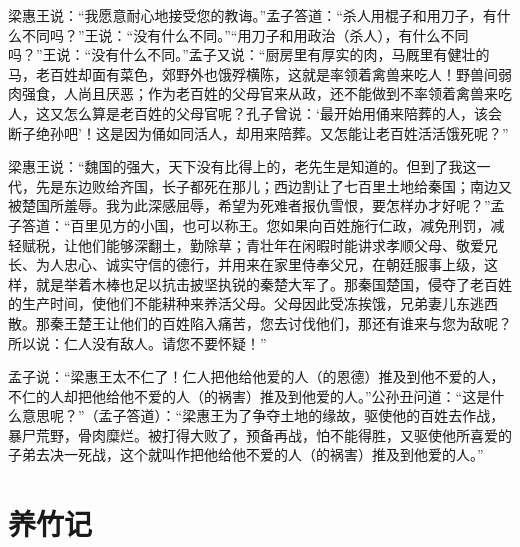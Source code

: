 \documentclass[12pt,UTF-8,openany,a4]{ctexbook}
\begin{document}
\begin{large}
    梁惠王说：“我愿意耐心地接受您的教诲。”孟子答道：“杀人用棍子和用刀子，有什么不同吗？”王说：“没有什么不同。”“用刀子和用政治（杀人），有什么不同吗？”王说：“没有什么不同。”孟子又说：“厨房里有厚实的肉，马厩里有健壮的马，老百姓却面有菜色，郊野外也饿殍横陈，这就是率领着禽兽来吃人！野兽间弱肉强食，人尚且厌恶；作为老百姓的父母官来从政，还不能做到不率领着禽兽来吃人，这又怎么算是老百姓的父母官呢？孔子曾说：‘最开始用俑来陪葬的人，该会断子绝孙吧’！这是因为俑如同活人，却用来陪葬。又怎能让老百姓活活饿死呢？”
    
    梁惠王说：“魏国的强大，天下没有比得上的，老先生是知道的。但到了我这一代，先是东边败给齐国，长子都死在那儿；西边割让了七百里土地给秦国；南边又被楚国所羞辱。我为此深感屈辱，希望为死难者报仇雪恨，要怎样办才好呢？”孟子答道：“百里见方的小国，也可以称王。您如果向百姓施行仁政，减免刑罚，减轻赋税，让他们能够深翻土，勤除草；青壮年在闲暇时能讲求孝顺父母、敬爱兄长、为人忠心、诚实守信的德行，并用来在家里侍奉父兄，在朝廷服事上级，这样，就是举着木棒也足以抗击披坚执锐的秦楚大军了。那秦国楚国，侵夺了老百姓的生产时间，使他们不能耕种来养活父母。父母因此受冻挨饿，兄弟妻儿东逃西散。那秦王楚王让他们的百姓陷入痛苦，您去讨伐他们，那还有谁来与您为敌呢？所以说：仁人没有敌人。请您不要怀疑！”
    
    孟子说：“梁惠王太不仁了！仁人把他给他爱的人（的恩德）推及到他不爱的人，不仁的人却把他给他不爱的人（的祸害）推及到他爱的人。”公孙丑问道：“这是什么意思呢？”（孟子答道）：“梁惠王为了争夺土地的缘故，驱使他的百姓去作战，暴尸荒野，骨肉糜烂。被打得大败了，预备再战，怕不能得胜，又驱使他所喜爱的子弟去决一死战，这个就叫作把他给他不爱的人（的祸害）推及到他爱的人。”
    
\end{large}



\chapter{养竹记}
\end{document}
